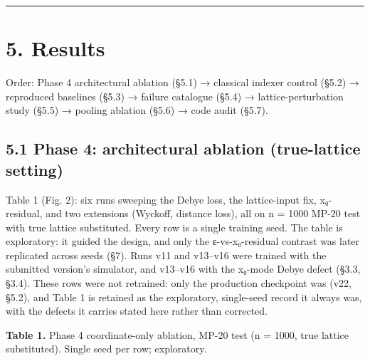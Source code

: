 \documentclass[
  11pt,
]{article}
\begin{document}
\begin{center}\rule{0.5\linewidth}{0.5pt}\end{center}

\section{5. Results}\label{results}

Order: Phase 4 architectural ablation (§5.1) → classical indexer control
(§5.2) → reproduced baselines (§5.3) → failure catalogue (§5.4) →
lattice-perturbation study (§5.5) → pooling ablation (§5.6) → code audit
(§5.7).

\subsection{5.1 Phase 4: architectural ablation (true-lattice
setting)}\label{phase-4-architectural-ablation-true-lattice-setting}

Table 1 (Fig. 2): six runs sweeping the Debye loss, the lattice-input
fix, x₀-residual, and two extensions (Wyckoff, distance loss), all on n
= 1000 MP-20 test with true lattice substituted. Every row is a single
training seed. The table is exploratory: it guided the design, and only
the ε-vs-x₀-residual contrast was later replicated across seeds (§7).
Runs v11 and v13--v16 were trained with the submitted version's
simulator, and v13--v16 with the x₀-mode Debye defect (§3.3, §3.4).
These rows were not retrained: only the production checkpoint was (v22,
§5.2), and Table 1 is retained as the exploratory, single-seed record it
always was, with the defects it carries stated here rather than
corrected.

\textbf{Table 1.} Phase 4 coordinate-only ablation, MP-20 test (n =
1000, true lattice substituted). Single seed per row; exploratory.
\end{document}
